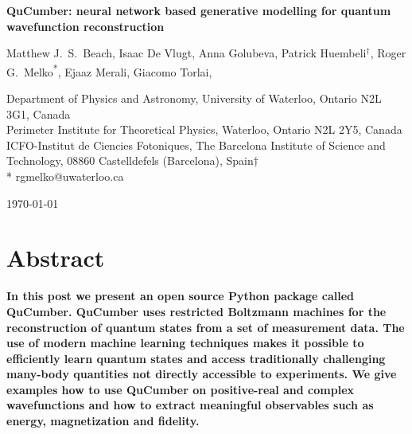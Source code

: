 \documentclass[submission, Phys]{SciPost}
\begin{document}
\begin{center}{\Large \textbf{
QuCumber: neural network based generative modelling for quantum wavefunction reconstruction
}}\end{center}

\begin{center}
Matthew J.~S.~Beach,
Isaac De Vlugt,
Anna Golubeva,
Patrick Huembeli$^\dag$,
Roger G.~Melko\textsuperscript{*},
Ejaaz Merali,
Giacomo Torlai,
\end{center}

\begin{center}
Department of Physics and Astronomy, University of Waterloo, Ontario N2L 3G1, Canada
\\
Perimeter Institute for Theoretical Physics, Waterloo, Ontario N2L 2Y5, Canada
ICFO-Institut  de  Ciencies  Fotoniques,  The  Barcelona  Institute  of Science  and  Technology, 08860  Castelldefels  (Barcelona),  Spain$\dag$ \\
* rgmelko@uwaterloo.ca \\
\end{center}

\begin{center}
\today
\end{center}


\section*{Abstract}
{\bf
In this post we present an open source Python package called QuCumber.  QuCumber uses restricted Boltzmann machines 
for the reconstruction of quantum states from a set of measurement data. The use of modern machine learning techniques makes it possible to efficiently learn quantum states and access traditionally challenging many-body quantities not directly accessible to experiments. We give examples how to use QuCumber on positive-real and complex wavefunctions and how to extract meaningful observables such as energy, magnetization and fidelity.
}
\end{document}
